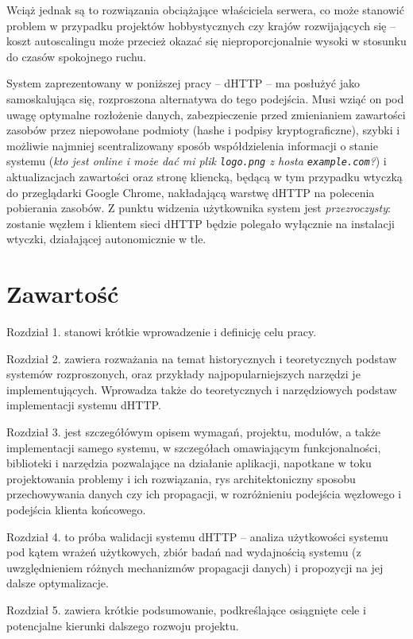 Wciąż jednak są to rozwiązania obciążające właściciela serwera, co może stanowić problem w przypadku projektów hobbystycznych czy krajów rozwijających się -- koszt autoscalingu może przecież okazać się nieproporcjonalnie wysoki w stosunku do czasów spokojnego ruchu.


System zaprezentowany w poniższej pracy -- dHTTP -- ma posłużyć jako samoskalująca się, rozproszona alternatywa do tego podejścia. Musi wziąć on pod uwagę optymalne rozłożenie danych, zabezpieczenie przed zmienianiem zawartości zasobów przez niepowołane podmioty (hashe i podpisy kryptograficzne), szybki i możliwie najmniej scentralizowany sposób współdzielenia informacji o stanie systemu ({\em kto jest online i może dać mi plik \texttt{logo.png} z hosta \texttt{example.com}?}) i aktualizacjach zawartości oraz stronę kliencką, będącą w tym przypadku wtyczką do przeglądarki Google Chrome, nakładającą warstwę dHTTP na polecenia pobierania zasobów. Z punktu widzenia użytkownika system jest {\em przezroczysty}: zostanie  węzłem i klientem sieci dHTTP będzie polegało wyłącznie na instalacji wtyczki, działającej autonomicznie w tle.

\section{Zawartość}
\label{sec:zawartosc}

Rozdział 1. stanowi krótkie wprowadzenie i definicję celu pracy. 

Rozdział 2. zawiera rozważania na temat historycznych i teoretycznych podstaw systemów rozproszonych, oraz przykłady najpopularniejszych narzędzi je implementujących. Wprowadza także do teoretycznych i narzędziowych podstaw implementacji systemu dHTTP. 

Rozdział 3. jest szczegółówym opisem wymagań, projektu, modułów, a także implementacji samego systemu, w szczegółach omawiającym funkcjonalności, biblioteki i narzędzia pozwalające na działanie aplikacji, napotkane w toku projektowania problemy i ich rozwiązania, rys architektoniczny sposobu przechowywania danych czy ich propagacji, w rozróżnieniu podejścia węzłowego i podejścia klienta końcowego.

Rozdział 4. to próba walidacji systemu dHTTP – analiza użytkowości systemu pod kątem wrażeń użytkowych, zbiór badań nad wydajnością systemu (z uwzględnieniem różnych mechanizmów propagacji danych) i propozycji na jej dalsze optymalizacje.

Rozdział 5. zawiera krótkie podsumowanie, podkreślające osiągnięte cele i potencjalne kierunki dalszego rozwoju projektu.

